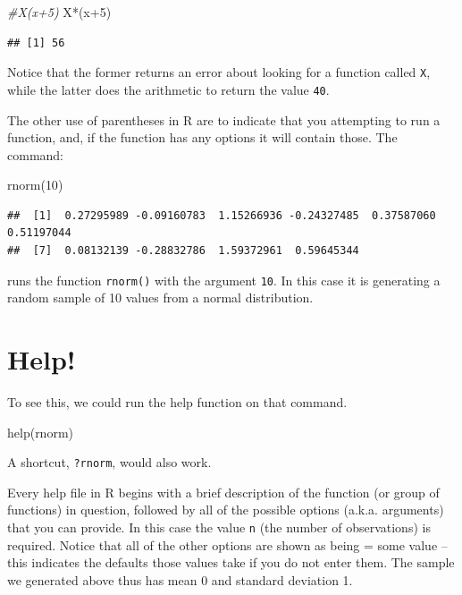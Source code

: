 \documentclass[
]{book}
\newenvironment{Shaded}{\begin{snugshade}}{\end{snugshade}}
\newcommand{\CommentTok}[1]{\textcolor[rgb]{0.56,0.35,0.01}{\textit{#1}}}
\newcommand{\DecValTok}[1]{\textcolor[rgb]{0.00,0.00,0.81}{#1}}
\newcommand{\FunctionTok}[1]{\textcolor[rgb]{0.00,0.00,0.00}{#1}}
\newcommand{\NormalTok}[1]{#1}
\newcommand{\SpecialCharTok}[1]{\textcolor[rgb]{0.00,0.00,0.00}{#1}}
\begin{document}
\begin{Shaded}
\begin{Highlighting}[]
\CommentTok{\#X(x+5)}
\NormalTok{X}\SpecialCharTok{*}\NormalTok{(x}\SpecialCharTok{+}\DecValTok{5}\NormalTok{)}
\end{Highlighting}
\end{Shaded}

\begin{verbatim}
## [1] 56
\end{verbatim}

Notice that the former returns an error about looking for a function called \texttt{X}, while the latter does the arithmetic to return the value \texttt{40}.

The other use of parentheses in R are to indicate that you attempting to run a function, and, if the function has any options it will contain those. The command:

\begin{Shaded}
\begin{Highlighting}[]
\FunctionTok{rnorm}\NormalTok{(}\DecValTok{10}\NormalTok{)}
\end{Highlighting}
\end{Shaded}

\begin{verbatim}
##  [1]  0.27295989 -0.09160783  1.15266936 -0.24327485  0.37587060  0.51197044
##  [7]  0.08132139 -0.28832786  1.59372961  0.59645344
\end{verbatim}

runs the function \texttt{rnorm()} with the argument \texttt{10}. In this case it is generating a random sample of 10 values from a normal distribution.

\hypertarget{help}{%
\section{Help!}\label{help}}

To see this, we could run the help function on that command.

\begin{Shaded}
\begin{Highlighting}[]
\FunctionTok{help}\NormalTok{(rnorm)}
\end{Highlighting}
\end{Shaded}

A shortcut, \texttt{?rnorm}, would also work.

Every help file in R begins with a brief description of the function (or group of functions) in question, followed by all of the possible options (a.k.a. arguments) that you can provide. In this case the value \texttt{n} (the number of observations) is required. Notice that all of the other options are shown as being = some value -- this indicates the defaults those values take if you do not enter them. The sample we generated above thus has mean 0 and standard deviation 1.
\end{document}
